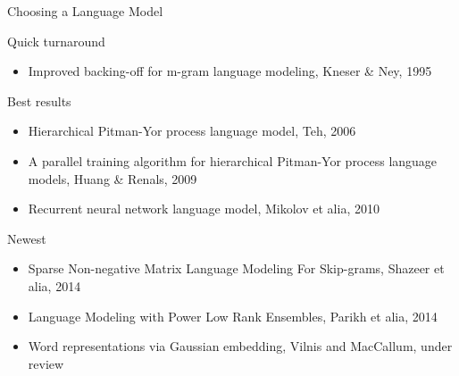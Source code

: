 \documentclass[department=cls, notes={hide notes}, official=true]{beamerruhuisstijl}
\begin{document}
\begin{frame}{Choosing a Language Model}
	\begin{block}{Quick turnaround}
    	\begin{itemize}
    	\item[\PencilRightDown] Improved backing-off for m-gram language modeling, Kneser \& Ney, 1995
        \end{itemize}
    \end{block}
    
    \begin{block}{Best results}
    	\begin{itemize}
    	\item[\PencilRightDown] Hierarchical Pitman-Yor process language model, Teh, 2006
        \item[\PencilRightDown] A parallel training algorithm for hierarchical Pitman-Yor process language models, Huang \& Renals, 2009
		\item[\PencilRightDown] Recurrent neural network language model, Mikolov et alia, 2010
		\end{itemize}
\end{block}
    
    \begin{block}{Newest}
    	\begin{itemize}
          \item[\PencilRightDown] Sparse Non-negative Matrix Language Modeling For Skip-grams, Shazeer et alia, 2014
          \item[\PencilRightDown] Language Modeling with Power Low Rank Ensembles, Parikh et alia, 2014
          \item[\PencilRightDown] Word representations via Gaussian embedding, Vilnis and MacCallum, under review
       \end{itemize}
    \end{block}

\end{frame}
\end{document}
